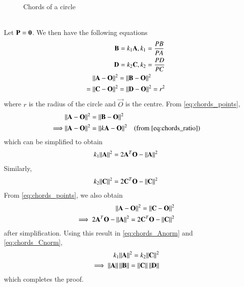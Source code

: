 \documentclass[journal,12pt,twocolumn]{IEEEtran}
\renewcommand\thesection{\arabic{section}}
\begin{document}
\begin{enumerate}[label=\thesection.\arabic*
,ref=\thesection.\theenumi]
\begin{figure}[!ht]
\begin{center}
		\resizebox{\columnwidth}{!}{}
	\end{center}
	\caption{Chords of a circle}
	\label{fig:chords}	
\end{figure}
\\
\solution Let $\mathbf{P} = \mathbf{0}$.  We then have the following equations
\begin{align}
\begin{split}
\mathbf{B} &= k_1 \mathbf{A}, k_1 = \frac{PB}{PA}
\\
\mathbf{D} &= k_2 \mathbf{C}, k_2 = \frac{PD}{PC}
\end{split}
\label{eq:chords_ratio}
\\
\begin{split}
\lVert\mathbf{A}-\mathbf{O}\rVert^2 &= \lVert\mathbf{B}-\mathbf{O}\rVert^2 
\\
= \lVert\mathbf{C}-\mathbf{O}\rVert^2 &= \lVert\mathbf{D}-\mathbf{O}\rVert^2 = r^2
\end{split}
\label{eq:chords_points}
\end{align}
%
where $r$ is the radius of the circle and $\vec{O}$ is the centre. From \eqref{eq:chords_points},
\begin{align}
&\lVert\mathbf{A}-\mathbf{O}\rVert^2 = \lVert\mathbf{B}-\mathbf{O}\rVert^2
\\
\implies &\lVert\mathbf{A}-\mathbf{O}\rVert^2 = \lVert k\mathbf{A}-\mathbf{O}\rVert^2 \quad(\text{from \eqref{eq:chords_ratio}})
\end{align}
%
which can be simplified to obtain
\begin{align}
k_1\lVert\mathbf{A}\rVert^2 = 2\mathbf{A}^T\mathbf{O}-\lVert\mathbf{A}\rVert^2
\label{eq:chords_Anorm}
\end{align}
Similarly,
\begin{align}
k_2\lVert\mathbf{C}\rVert^2 = 2\mathbf{C}^T\mathbf{O}-\lVert\mathbf{C}\rVert^2
\label{eq:chords_Cnorm}
\end{align}
%
From \eqref{eq:chords_points}, we also obtain
\begin{align}
\lVert\mathbf{A}-\mathbf{O}\rVert^2 
= \lVert\mathbf{C}-\mathbf{O}\rVert^2 
\\
\implies 2\mathbf{A}^T\mathbf{O}-\lVert\mathbf{A}\rVert^2 = 2\mathbf{C}^T\mathbf{O}-\lVert\mathbf{C}\rVert^2
\label{eq:chords_ACnorm}
\end{align}
%
after simplification. Using this result in \eqref{eq:chords_Anorm} and \eqref{eq:chords_Cnorm},
\begin{align}
k_1\lVert\mathbf{A}\rVert^2 = k_2\lVert\mathbf{C}\rVert^2
\\
\implies \lVert\mathbf{A}\rVert\, \lVert\mathbf{B}\rVert=\lVert\mathbf{C}\rVert\,\lVert\mathbf{D}\rVert
\end{align}
which completes the proof.

\end{enumerate}
\end{document}
